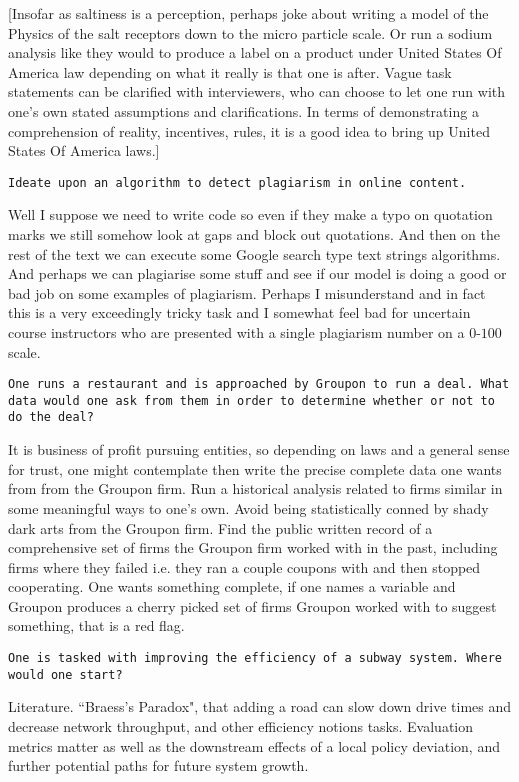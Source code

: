 [Insofar as saltiness is a perception, perhaps joke about writing a model of the Physics of the salt receptors down to the micro particle scale. Or run a sodium analysis like they would to produce a label on a product under United States Of America law depending on what it really is that one is after. Vague task statements can be clarified with interviewers, who can choose to let one run with one's own stated assumptions and clarifications. In terms of demonstrating a comprehension of reality, incentives, rules, it is a good idea to bring up United States Of America laws.]

\texttt{Ideate upon an algorithm to detect plagiarism in online content.}

Well I suppose we need to write code so even if they make a typo on quotation marks we still somehow look at gaps and block out quotations. And then on the rest of the text we can execute some Google search type text strings algorithms. And perhaps we can plagiarise some stuff and see if our model is doing a good or bad job on some examples of plagiarism. Perhaps I misunderstand and in fact this is a very exceedingly tricky task and I somewhat feel bad for uncertain course instructors who are presented with a single plagiarism number on a $0$-$100$ scale.

\texttt{One runs a restaurant and is approached by Groupon to run a deal. What data would one ask from them in order to determine whether or not to do the deal?}

It is business of profit pursuing entities, so depending on laws and a general sense for trust, one might contemplate then write the precise complete data one wants from from the Groupon firm. Run a historical analysis related to firms similar in some meaningful ways to one's own. Avoid being statistically conned by shady dark arts from the Groupon firm. Find the public written record of a comprehensive set of firms the Groupon firm worked with in the past, including firms where they failed i.e. they ran a couple coupons with and then stopped cooperating. One wants something complete, if one names a variable and Groupon produces a cherry picked set of firms Groupon worked with to suggest something, that is a red flag.

\texttt{One is tasked with improving the efficiency of a subway system. Where would one start?}

Literature. ``Braess's Paradox", that adding a road can slow down drive times and decrease network throughput, and other efficiency notions tasks. Evaluation metrics matter as well as the downstream effects of a local policy deviation, and further potential paths for future system growth.


